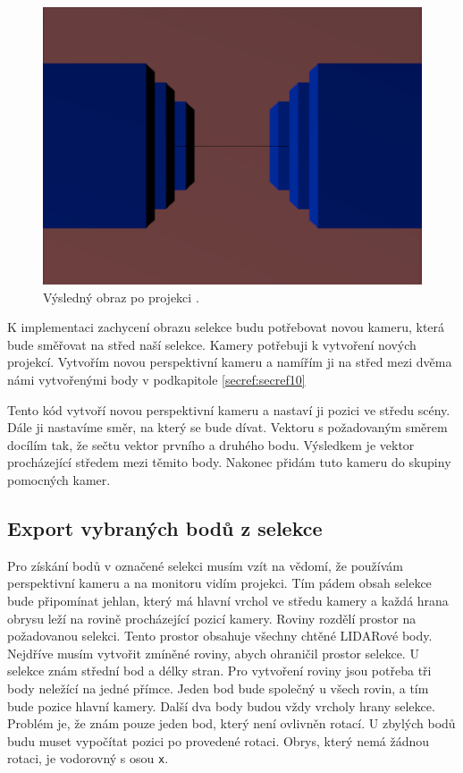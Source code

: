\documentclass[czech,bachelor,dept420,male,cpdeclaration]{diploma}
\begin{document}
\begin{figure}[H]
\centering
\includegraphics[width=0.6\linewidth]{Figures/finalProjectionImageFromCamera.png}
\caption{Výsledný obraz po projekci \cite{tutorial3matrices}. }
\label{fig:finalProjectionImageFromCamera}
\end{figure} 

K implementaci zachycení obrazu selekce budu potřebovat novou kameru, která bude směřovat na střed naší selekce. Kamery potřebuji k vytvoření nových projekcí. Vytvořím novou perspektivní kameru a namířím ji na střed mezi dvěma námi vytvořenými body v podkapitole \ref{secref:secref10} 


 
Tento kód vytvoří novou perspektivní kameru a nastaví ji pozici ve středu scény. Dále ji nastavíme směr, na který se bude dívat. Vektoru s požadovaným směrem docílím tak, že sečtu vektor prvního a druhého bodu. Výsledkem je vektor procházející středem mezi těmito body. Nakonec přidám tuto kameru do skupiny pomocných kamer. 




\subsection{Export vybraných bodů z selekce}
Pro získání bodů v označené selekci musím vzít na vědomí, že používám perspektivní kameru a na monitoru vidím projekci. Tím pádem obsah selekce bude připomínat jehlan, který má hlavní vrchol ve středu kamery a každá hrana obrysu leží na rovině procházející pozicí kamery. Roviny rozdělí prostor na požadovanou selekci. Tento prostor obsahuje všechny chtěné LIDARové body. Nejdříve musím vytvořit zmíněné roviny, abych ohraničil prostor selekce. U selekce znám střední bod a délky stran. Pro vytvoření roviny jsou potřeba tři body neležící na jedné přímce. Jeden bod bude společný u všech rovin, a tím bude pozice hlavní kamery. Další dva body budou vždy vrcholy hrany selekce. Problém je, že znám pouze jeden bod, který není ovlivněn rotací. U zbylých bodů budu muset vypočítat pozici po provedené rotaci. Obrys, který nemá žádnou rotaci, je vodorovný s osou \texttt{x}. 
\end{document}
